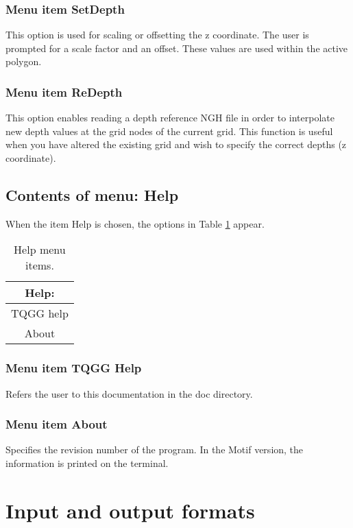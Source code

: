 \documentclass{article}
\begin{document}
\subsubsection[Menu item SetDepth]{Menu item SetDepth}
This option is used for scaling or offsetting the z coordinate. The user is prompted for a scale factor and an offset. These values are used within the active polygon.


\subsubsection[Menu item ReDepth]{Menu item ReDepth}
This option enables reading a depth reference NGH file in order to interpolate new depth values at the grid nodes of the current grid. This function is useful when you have altered the existing grid and wish to specify the correct depths (z coordinate). 


\subsection{Contents of menu: Help}
When the item Help is chosen, the options in Table \ref{tab:HELP} appear.

\begin{table}[htb!]
 \caption{Help menu items.}
  \begin{center}
   \begin{tabular}{|c|}
    \hline
Help:\\     \hline
TQGG help \\
About \\
    \hline
   \end{tabular}
   \label{tab:HELP}
  \end{center}
\end{table}


\subsubsection[Menu item TQGG Help]{Menu item TQGG Help}
Refers the user to this documentation in the doc directory.

\subsubsection[Menu item About]{Menu item About}
Specifies the revision number of the program. In the Motif version, the information is printed on the terminal.



\section{Input and output formats} \label{sec:formats}
\end{document}
